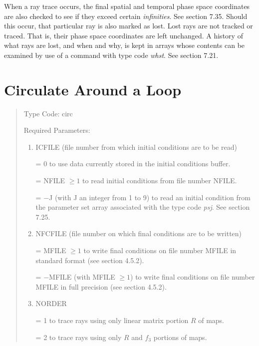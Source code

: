 When a ray trace occurs, the final spatial and temporal phase space coordinates
are also checked to see if they exceed certain {\em infinities}.  See
section 7.35.  Should this occur, that particular ray is also marked as
lost.  Lost rays are not tracked or traced.  That is, their phase space
coordinates are left unchanged.  A history of what rays are lost, and when and why, is kept in \Mary
arrays whose contents can be examined by use of a command with type code
{\em whst}.  See section 7.21.

\newpage
\section{Circulate Around a Loop}
\begin{quotation}
\noindent     Type Code:  circ 
\vspace{5mm}

\noindent Required Parameters:
\begin{enumerate}
      \item  ICFILE (file number from which initial conditions are to be
             read)

             = 0 to use data currently stored in the initial conditions buffer.

             = NFILE $\geq 1$ to read initial conditions from file number NFILE.

             = $-$J (with J an integer from 1 to 9) to read an initial
               condition from the parameter set array associated with the
               type code {\em psj}.  See section 7.25.

      \item  NFCFILE (file number on which final conditions are to be
             written)

             = MFILE $\geq 1$ to write final conditions on file number MFILE in
               standard \hspace*{1em}format (see section 4.5.2).

             = $-$MFILE (with MFILE $\geq 1$) to write final conditions on file
               number \hspace*{1em}MFILE in full precision (see section 4.5.2).

      \item  NORDER

             = 1 to trace rays using only linear matrix portion $R$ of maps.

             = 2 to trace rays using only $R$ and $f_3$  portions of maps.


\end{enumerate}
\end{quotation}
